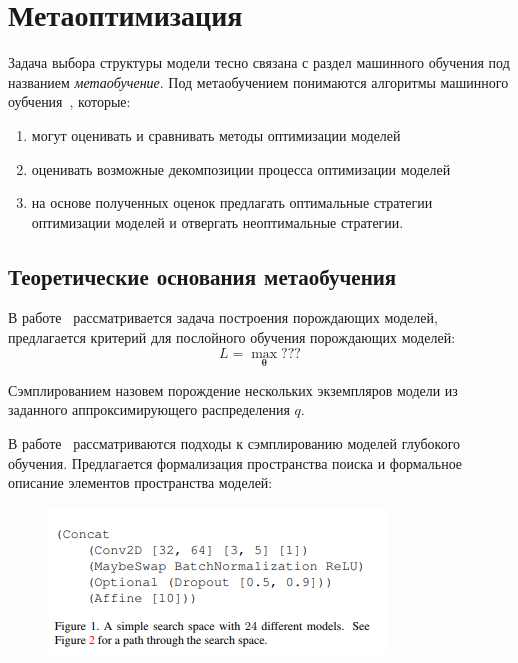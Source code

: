 \section{Метаоптимизация}
Задача выбора структуры модели тесно связана с раздел машинного обучения под названием \textit{метаобучение}. Под метаобучением понимаются алгоритмы машинного оубчения~\cite{metalearn}, которые:
\begin{enumerate}
\item могут оценивать и сравнивать методы оптимизации моделей
\item оценивать возможные декомпозиции процесса оптимизации моделей
\item на основе полученных оценок предлагать оптимальные стратегии оптимизации моделей и отвергать неоптимальные стратегии. 
\end{enumerate}



\subsection{Теоретические основания метаобучения }
В работе~\cite{layerwise_optimal} рассматривается задача построения порождающих моделей, предлагается критерий для послойного обучения порождающих моделей:
$$
L = \max_{\boldsymbol{\theta}} ???
$$

\begin{defin}
Сэмплированием назовем порождение нескольких экземпляров модели из заданного аппроксимирующего распределения $q$.
\end{defin}

В работе~\cite{search_space} рассматриваются подходы к сэмплированию моделей глубокого обучения. Предлагается формализация пространства поиска и формальное описание элементов  пространства моделей:
 \begin{figure}[H]
\includegraphics[width=\textwidth]{./plots/arch_review_figs/search_space.png}
\end{figure}

